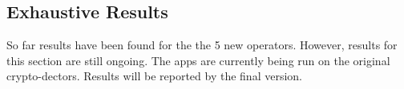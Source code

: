 \subsection{Exhaustive Results}
\label{ch5:sec:discussion}

So far results have been found for the the 5 new operators. However, results for this section are still ongoing. The apps are currently being run on the original crypto-dectors. Results will be reported by the final version.